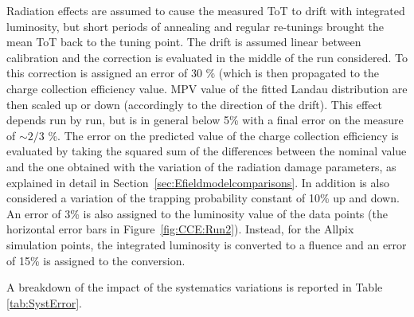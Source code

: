Radiation effects are assumed to cause the measured ToT to drift  with integrated luminosity, but short periods of annealing and regular re-tunings brought the mean ToT back to the tuning point. The drift is assumed linear between calibration and the correction is evaluated in the middle of the run considered. To this correction is assigned an error of 30 \% (which is then propagated to the charge collection efficiency value. MPV value of the fitted Landau distribution are then scaled up or down (accordingly to the direction of the drift). This effect depends run by run, but is in general below 5\% with a final error on the measure of $\sim 2/3 $ \%. The error on the predicted value of the charge collection efficiency is evaluated by taking the squared sum of the differences between the nominal value and the one obtained with the variation of the radiation damage parameters, as explained in detail in Section~\ref{sec:Efieldmodelcomparisons}. In addition is also considered a variation of the trapping probability constant of 10\% up and down. An error of 3\% is also assigned to the luminosity value of the data points (the horizontal error bars in Figure~\ref{fig:CCE:Run2}). Instead, for the Allpix simulation points, the integrated luminosity is converted to a fluence 
and an error of 15\% is assigned to the conversion. 


A breakdown of the impact of the systematics variations is reported in Table \ref{tab:SystError}.



